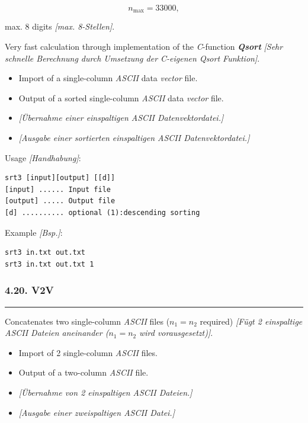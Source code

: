 \documentclass[
]{article}
\begin{document}
\[n_{\max} = 33000,\]

max. 8 digits \emph{{[}max. 8-Stellen{]}}.

Very fast calculation through implementation of the \emph{C}-function
\textbf{\emph{Qsort}} \emph{{[}Sehr schnelle Berechnung durch Umsetzung
der C-eigenen Qsort Funktion{]}}.

\begin{itemize}
\item
  Import of a single-column \emph{ASCII} data \emph{vector} file.
\item
  Output of a sorted single-column \emph{ASCII} data \emph{vector} file.
\item
  \emph{{[}Übernahme einer einspaltigen ASCII Datenvektordatei.{]}}
\item
  \emph{{[}Ausgabe einer sortierten einspaltigen ASCII
  Datenvektordatei.{]}}
\end{itemize}

Usage \emph{{[}Handhabung{]}}:

\begin{verbatim}
srt3 [input][output] [[d]] 
[input] ...... Input file 
[output] ..... Output file 
[d] .......... optional (1):descending sorting
\end{verbatim}

Example \emph{{[}Bsp.{]}}:

\begin{verbatim}
srt3 in.txt out.txt
srt3 in.txt out.txt 1
\end{verbatim}

\hypertarget{v2v}{%
\subsubsection{4.20. V2V}\label{v2v}}

\begin{center}\rule{0.5\linewidth}{0.5pt}\end{center}

Concatenates two single-column \emph{ASCII} files (\(n_{1} = n_{2}\)
required) \emph{{[}Fügt 2 einspaltige ASCII Dateien aneinander
(}\(n_{1} = n_{2}\) \emph{wird vorausgesetzt){]}}.

\begin{itemize}
\item
  Import of 2 single-column \emph{ASCII} files.
\item
  Output of a two-column \emph{ASCII} file.
\item
  \emph{{[}Übernahme von 2 einspaltigen ASCII Dateien.{]}}
\item
  \emph{{[}Ausgabe einer zweispaltigen ASCII Datei.{]}}
\end{itemize}
\end{document}
